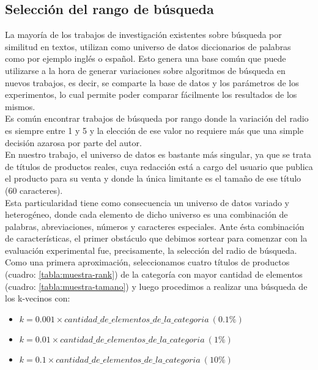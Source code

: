 \subsection{Selecci\'on del rango de b\'usqueda}

La mayor\'ia de los trabajos de investigaci\'on existentes sobre b\'usqueda por similitud en textos, utilizan como universo de datos diccionarios de palabras como por ejemplo ingl\'es o español. Esto genera una base com\'un que puede utilizarse a la hora de generar variaciones sobre algoritmos de b\'usqueda en nuevos trabajos, es decir, se comparte la base de datos y los par\'ametros de los experimentos, lo cual permite poder comparar f\'acilmente los resultados de los mismos.\\
 
Es com\'un encontrar trabajos de b\'usqueda por rango donde la variaci\'on del radio es siempre entre 1 y 5 y la elecci\'on de ese valor no requiere m\'as que una simple decisi\'on azarosa por parte del autor.\\

En nuestro trabajo, el universo de datos es bastante m\'as singular, ya que se trata de t\'itulos de productos reales, cuya redacci\'on est\'a a cargo del usuario que publica el producto para su venta y donde la \'unica limitante es el tama\~no de ese t\'itulo (60 caracteres).\\

Esta particularidad tiene como consecuencia un universo de datos variado y heterog\'eneo, donde cada elemento de dicho universo es una combinaci\'on de palabras, abreviaciones, n\'umeros y caracteres especiales. Ante \'esta combinaci\'on de caracter\'isticas, el primer obst\'aculo que debimos sortear para comenzar con la evaluaci\'on experimental fue, precisamente, la selecci\'on del radio de b\'usqueda.\\

Como una primera aproximaci\'on, seleccionamos cuatro t\'itulos de productos (cuadro: \ref{tabla:muestra-rank}) de la categor\'ia con mayor cantidad de elementos (cuadro: \ref{tabla:muestra-tamano}) y luego procedimos a realizar una b\'usqueda de los k-vecinos con:\\

\begin{itemize}
\item $k= 0.001 \times  cantidad\_de\_elementos\_de\_la\_categoria\ (0.1\%)$
\item $k= 0.01 \times cantidad\_de\_elementos\_de\_la\_categoria\ (1\%)$
\item $k= 0.1 \times cantidad\_de\_elementos\_de\_la\_categoria\ (10\%)$
\end{itemize}

